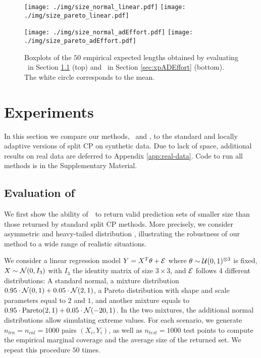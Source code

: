 \begin{figure}[t]
	\centering
	\texttt{[image: ./img/size\_normal\_linear.pdf]}
	\hspace{-.5em}\texttt{[image: ./img/size\_pareto\_linear.pdf]}
	
	\texttt{[image: ./img/size\_normal\_adEffort.pdf]}
	\hspace{-.5em}\texttt{[image: ./img/size\_pareto\_adEffort.pdf]}
	\vspace{-.4em}
	\caption{Boxplots of the $50$ empirical expected lengths obtained by evaluating \method~in Section \ref{sec:xpEffort} (top) and \methodAD~in Section \ref{sec:xpADEffort} (bottom). The white circle corresponds to the mean.}  
	\label{fig:illustr_synth}
\end{figure}

\section{Experiments}
\label{sec:xps}

In this section we compare our methods, \method~and \methodAD, to the standard and locally adaptive versions of split CP on synthetic data. Due to lack of space, additional results on real data are deferred to Appendix \ref{app:real-data}. Code to run all methods is in the Supplementary Material.

\subsection{Evaluation of \method}\label{sec:xpEffort}
We first show the ability of~\method~to return valid prediction sets of smaller size than those returned by standard split CP methods. More precisely, we consider asymmetric and heavy-tailed distribution%
, illustrating the robustness of our method to a wide range of realistic situations. %

We consider a linear regression model $Y = X^T \theta + {\cal E}$ where $\theta \sim {\cal U}(0, 1)^{\otimes 3}$ is fixed, $X \sim {\cal N}(0, I_3)$ with $I_3$ the identity matrix of size $3 \times 3$, and ${\cal E}$ follows 4 different distributions: A standard normal, a mixture distribution $0.95 \cdot {\cal N}(0, 1) + 0.05 \cdot {\cal N}(2, 1)$, a Pareto distribution with shape and scale parameters equal to $2$ and $1$, and another mixture equals to $0.95 \cdot \text{Pareto}(2, 1) + 0.05 \cdot {\cal N}(-20, 1)$. In the two mixtures, the additional normal distributions allow simulating extreme values. For each scenario, we generate $n_{lrn}=n_{cal}=1000$ pairs $(X_i, Y_i)$, as well as $n_{test}=1000$ test points to compute the empirical marginal coverage and the average size of the returned set. We repeat this procedure $50$ times.


